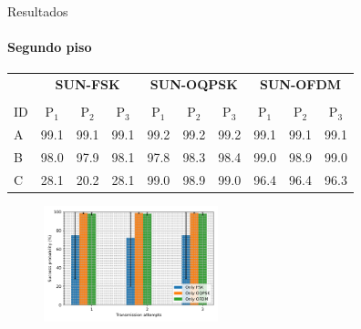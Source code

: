 \documentclass[c]{beamer}
\begin{document}
\begin{darkframes}
  \begin{frame}{Resultados}
    \framesubtitle{Segundo piso}
    \begin{table}[!b]
      \centering
      {\carlitoTLF %
        \begin{tabularx}{\textwidth}{Xccccccccc}
              & \multicolumn{3}{c|}{\textbf{SUN-FSK}} & \multicolumn{3}{c|}{\textbf{SUN-OQPSK}} & \multicolumn{3}{c}{\textbf{SUN-OFDM}}                                                             \\ \cline{2-10}                                                       \\
          ID  & {P$_1$}                               & {P$_2$}                                 & {P$_3$}                               & {P$_1$} & {P$_2$} & {P$_3$} & {P$_1$} & {P$_2$} & {P$_3$} \\ \hline
          \toprule
          {A} & 99.1                                  & 99.1                                    & 99.1                                  & 99.2    & 99.2    & 99.2    & 99.1    & 99.1    & 99.1    \\ \hline
          {B} & 98.0                                  & 97.9                                    & 98.1                                  & 97.8    & 98.3    & 98.4    & 99.0    & 98.9    & 99.0    \\ \hline
          {C} & 28.1                                  & 20.2                                    & 28.1                                  & 99.0    & 98.9    & 99.0    & 96.4    & 96.4    & 96.3    \\ \hline
        \end{tabularx}}
    \end{table}
    \begin{figure}
      \centering
      \includegraphics[width=0.45\textwidth]{resources/mod_2_floor.png}
    \end{figure}
  \end{frame}


\end{darkframes}
\end{document}
